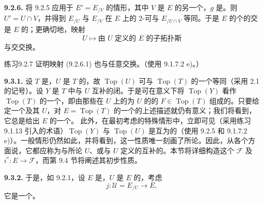 \textbf{9.2.6.} 将 9.2.5 应用于 $E'=E_{/V}$ 的情形，其中 $V$ 是 $E$ 的另一个，$g$ 是。则 $U'=U\cap V$，并得到 $E_{/U}$ 与 $E_{/V}$ 在 $E$ 上的 $2$-可与 $E_{/U\cap V}$ 等同。于是 $E$ 的个的交是 $E$ 的；更确切地，映射
\[
U\longmapsto\text{由 }U\text{ 定义的 }E\text{ 的子拓扑斯}\tag{9.2.6.1}
\]
与交交换。
\begin{SGAresult}{练习}{9.2.7}
证明映射 (9.2.6.1) 也与任意交换。（使用 9.1.7.2 e)。）
\end{SGAresult}
\textbf{9.3.1.} 设 $T$ 是，$U$ 是 $T$ 的，故 $\operatorname{Top}(U)$ 可与 $\operatorname{Top}(T)$ 的一个等同（采用 2.1 的记号）。设 $Y$ 是 $T$ 中与 $U$ 互补的闭。于是可在意义下将 $\operatorname{Top}(Y)$ 看作 $\operatorname{Top}(T)$ 的一个，即由那些在 $U$ 上的为 $U$ 的的 $F\in\operatorname{Top}(T)$ 组成的。只要给定一个及其 $U$，对 $E=\operatorname{Top}(T)$ 的一个的上述描述就仍有意义；我们将看到，它总是给出 $E$ 的一个。
此外，在最初考虑的特殊情形中，立即可见（采用练习 9.1.13 引入的术语）$\operatorname{Top}(Y)$ 与 $\operatorname{Top}(U)$ 是互为的（使用 9.2.5 和 9.1.7.2 e)）。一般情形仍然如此，并将看到，这一性质唯一刻画了所论。因此，从各个方面说，它都应称为与所论 $U$、或与 $U$ 定义的互补的。本节将详细构造这个 $\mathcal F$ 及 $i^*:E\to\mathcal F$，而第 9.4 节将阐述其初步性质。

\textbf{9.3.2.} 于是，如 9.2.1，设 $E$ 是，$U$ 是 $E$ 的，考虑
\[
j:\mathcal U=E_{/U}\longrightarrow E,\tag{9.3.2.1}
\]
它是一个。

